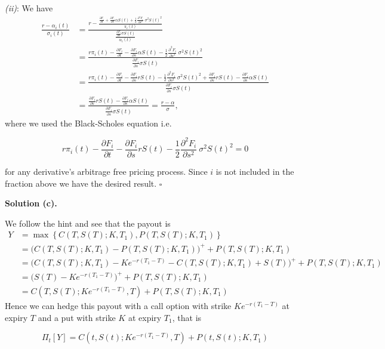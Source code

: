 \documentclass[a4paper,12pt,openany]{book}
\begin{document}
\emph{(ii)}: We have
\begin{align*}
\frac{r-\alpha_i(t)}{\sigma_i(t)}&=\frac{r-\frac{\frac{\partial F_i}{\partial t}+\frac{\partial F_i}{\partial s}\alpha S(t)+\frac{1}{2}\frac{\partial^2 F_i}{\partial s^2}\ \sigma^2 S(t)^2}{\pi_i(t)}}{\frac{\frac{\partial F_i}{\partial s}\sigma S(t)}{\alpha_i(t)}}\\
&=\frac{r\pi_i(t)-\frac{\partial F_i}{\partial t}-\frac{\partial F_i}{\partial s}\alpha S(t)-\frac{1}{2}\frac{\partial^2 F_i}{\partial s^2}\ \sigma^2 S(t)^2}{\frac{\partial F_i}{\partial s}\sigma S(t)}\\
&=\frac{r\pi_i(t)-\frac{\partial F_i}{\partial t}-\frac{\partial F_i}{\partial s}r S(t)-\frac{1}{2}\frac{\partial^2 F_i}{\partial s^2}\ \sigma^2 S(t)^2+\frac{\partial F_i}{\partial s}r S(t)-\frac{\partial F_i}{\partial s}\alpha S(t)}{\frac{\partial F_i}{\partial s}\sigma S(t)}\\
&=\frac{\frac{\partial F_i}{\partial s}r S(t)-\frac{\partial F_i}{\partial s}\alpha S(t)}{\frac{\partial F_i}{\partial s}\sigma S(t)}=\frac{r -\alpha }{\sigma },
\end{align*}
where we used the Black-Scholes equation i.e.

\[
r\pi_i(t)-\frac{\partial F_i}{\partial t}-\frac{\partial F_i}{\partial s}r S(t)-\frac{1}{2}\frac{\partial^2 F_i}{\partial s^2}\ \sigma^2 S(t)^2=0
\]

for any derivative's arbitrage free pricing process. Since \(i\) is not included in the fraction above we have the desired result. \(\square\)

\noindent\makebox[\linewidth]{\rule{\textwidth}{0.4pt}}

\textbf{Solution (c).}

We follow the hint and see that the payout is
\begin{align*}
Y&=\max\left\{C(T,S(T);K,T_1),P(T,S(T);K,T_1)\right\}\\
&=\Big(C(T,S(T);K,T_1)-P(T,S(T);K,T_1)\Big)^++P(T,S(T);K,T_1)\\
&=\Big(C(T,S(T);K,T_1)-Ke^{-r(T_1-T)}-C(T,S(T);K,T_1)+S(T)\Big)^++P(T,S(T);K,T_1)\\
&=\Big(S(T)-Ke^{-r(T_1-T)}\Big)^++P(T,S(T);K,T_1)\\
&=C(T,S(T);Ke^{-r(T_1-T)},T)+P(T,S(T);K,T_1)
\end{align*}
Hence we can hedge this payout with a call option with strike \(Ke^{-r(T_1-T)}\) at expiry \(T\) and a put with strike \(K\) at expiry \(T_1\), that is

\[
\Pi_t[Y]=C(t,S(t);Ke^{-r(T_1-T)},T)+P(t,S(t);K,T_1)
\]
\end{document}
